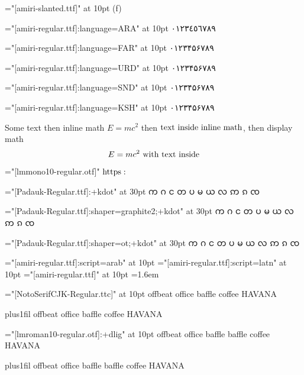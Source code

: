 \font\amiriteni="[amiri-slanted.ttf]" at 10pt
({\amiriteni f\/})

\def\l#1#2{%
  \begingroup%
  \font\testl="[amiri-regular.ttf]:language=#1" at 10pt
  \testl #2%
  \endgroup%
}
\l{ARA}{٠١٢٣٤٥٦٧٨٩}\par
\l{FAR}{۰۱۲۳۴۵۶۷۸۹}\par
\l{URD}{۰۱۲۳۴۵۶۷۸۹}\par
\l{SND}{۰۱۲۳۴۵۶۷۸۹}\par
\l{KSH}{۰۱۲۳۴۵۶۷۸۹}\par

Some text then inline math $E=mc^2$ then $\hbox{text inside inline math}$, then
display math $$E=mc^2\hbox{ with text inside}$$

\begingroup
\font\lmmono="[lmmono10-regular.otf]"
\lmmono $\fam0 \textfont0\font https:$
\endgroup

\font\padauk="[Padauk-Regular.ttf]:+kdot" at 30pt\padauk
က ဂ င တ ပ မ ယ လ ဢ ၵ ၸ \par
\font\padauk="[Padauk-Regular.ttf]:shaper=graphite2;+kdot" at 30pt\padauk
က ဂ င တ ပ မ ယ လ ဢ ၵ ၸ \par
\font\padauk="[Padauk-Regular.ttf]:shaper=ot;+kdot"        at 30pt\padauk
က ဂ င တ ပ မ ယ လ ဢ ၵ ၸ \par


\font\arab="[amiri-regular.ttf]:script=arab" at 10pt\arab
\font\latn="[amiri-regular.ttf]:script=latn" at 10pt\latn
\font\dflt="[amiri-regular.ttf]" at 10pt\dflt
\baselineskip=1.6em

\endgroup\vfill\eject

\begingroup
\parindent=0pt
\font\notoserifcjk="[NotoSerifCJK-Regular.ttc]" at 10pt
\notoserifcjk
\noindent
\smallskip
offbeat office baffle coffee HAVANA\par
\smallskip
\begingroup
\rightskip=0pt plus1fil  
offbeat office baffle coffee HAVANA\par
\endgroup
\endgroup
\vfill\eject

\font\lmten="[lmroman10-regular.otf]:+dlig" at 10pt
\begingroup
\parindent=0pt
\lmten
\noindent
\smallskip
offbeat office baffle {\rm baffle} coffee HAVANA\par
\smallskip
\begingroup
\rightskip=0pt plus1fil  
offbeat office baffle {\rm baffle} coffee HAVANA\par
\endgroup
\endgroup
\vfill\eject

